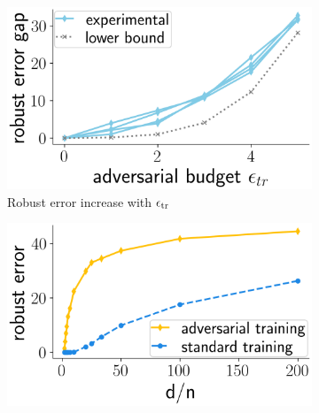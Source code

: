 
\begin{figure}[!t]
  \centering
\begin{subfigure}[b]{0.3\textwidth}
  \includegraphics[width=0.99\linewidth]{plotsAistats/gap_lower_final_main_theorem.png}
  \caption{Robust error increase with $\epsilon_{\text{tr}}$}
  \label{fig:main_lower_bound_eps}
\end{subfigure}
\begin{subfigure}[b]{0.3\textwidth}
  \includegraphics[width=0.99\linewidth]{plotsAistats/robust_error_ST_AT.png}

\end{subfigure}
\end{figure}
